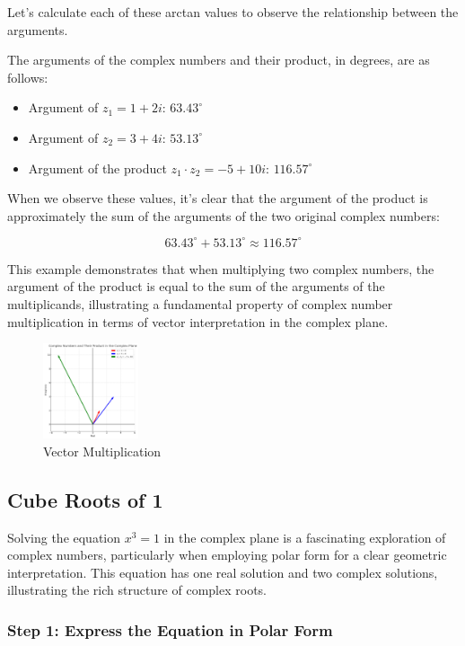 \documentclass[
]{article}
\providecommand{\tightlist}{%
  \setlength{\itemsep}{0pt}\setlength{\parskip}{0pt}}
\def\tightlist{}
\begin{document}
Let's calculate each of these arctan values to observe the relationship
between the arguments.

The arguments of the complex numbers and their product, in degrees, are
as follows:

\begin{itemize}
\tightlist
\item
  Argument of \(z_1 = 1 + 2i\): \(63.43^\circ\)
\item
  Argument of \(z_2 = 3 + 4i\): \(53.13^\circ\)
\item
  Argument of the product \(z_1 \cdot z_2 = -5 + 10i\): \(116.57^\circ\)
\end{itemize}

When we observe these values, it's clear that the argument of the
product is approximately the sum of the arguments of the two original
complex numbers:

\[63.43^\circ + 53.13^\circ \approx 116.57^\circ\]

This example demonstrates that when multiplying two complex numbers, the
argument of the product is equal to the sum of the arguments of the
multiplicands, illustrating a fundamental property of complex number
multiplication in terms of vector interpretation in the complex plane.

\begin{figure}
\centering
\includegraphics[width=0.25\textwidth,height=\textheight]{vector-mult-1.png}
\caption{Vector Multiplication}
\end{figure}

\subsection{Cube Roots of 1}\label{cube-roots-of-1}

Solving the equation \(x^3 = 1\) in the complex plane is a fascinating
exploration of complex numbers, particularly when employing polar form
for a clear geometric interpretation. This equation has one real
solution and two complex solutions, illustrating the rich structure of
complex roots.

\subsubsection{Step 1: Express the Equation in Polar
Form}\label{step-1-express-the-equation-in-polar-form}
\end{document}
